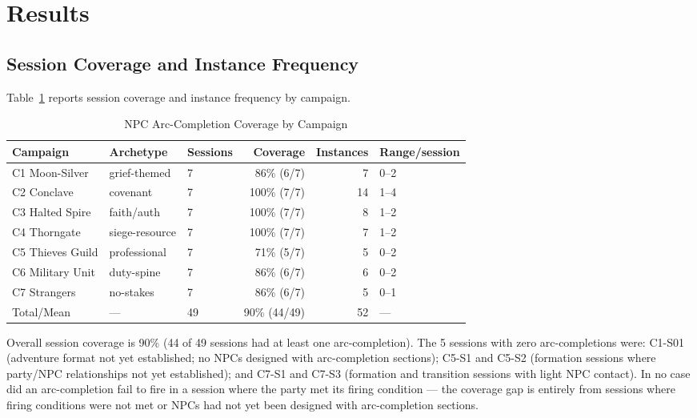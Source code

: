 
\section{Results}
\label{sec:results}

\subsection{Session Coverage and Instance Frequency}

Table~\ref{tab:coverage} reports session coverage and instance frequency by campaign.

\begin{table}[t]
\caption{NPC Arc-Completion Coverage by Campaign}
\label{tab:coverage}
\begin{tabular}{@{}lllrrl@{}}
\toprule
Campaign & Archetype & Sessions & Coverage & Instances & Range/session \\
\midrule
C1 Moon-Silver & grief-themed & 7 & 86\% (6/7) & 7 & 0--2 \\
C2 Conclave & covenant & 7 & 100\% (7/7) & 14 & 1--4 \\
C3 Halted Spire & faith/auth & 7 & 100\% (7/7) & 8 & 1--2 \\
C4 Thorngate & siege-resource & 7 & 100\% (7/7) & 7 & 1--2 \\
C5 Thieves Guild & professional & 7 & 71\% (5/7) & 5 & 0--2 \\
C6 Military Unit & duty-spine & 7 & 86\% (6/7) & 6 & 0--2 \\
C7 Strangers & no-stakes & 7 & 86\% (6/7) & 5 & 0--1 \\
\midrule
Total/Mean & --- & 49 & 90\% (44/49) & 52 & --- \\
\bottomrule
\end{tabular}
\end{table}

Overall session coverage is 90\% (44 of 49 sessions had at least one arc-completion).
The 5 sessions with zero arc-completions were: C1-S01 (adventure format not yet
established; no NPCs designed with arc-completion sections); C5-S1 and C5-S2
(formation sessions where party/NPC relationships not yet established); and C7-S1 and
C7-S3 (formation and transition sessions with light NPC contact). In no case did an
arc-completion fail to fire in a session where the party met its firing condition ---
the coverage gap is entirely from sessions where firing conditions were not met or
NPCs had not yet been designed with arc-completion sections.

